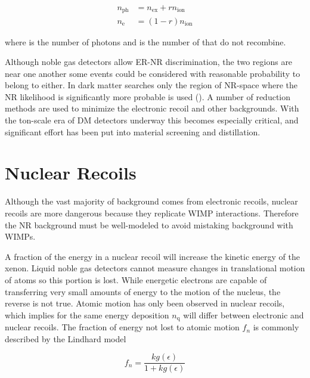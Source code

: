 \begin{subequations}
\begin{align}
n_{\mathrm{ph}} &= n_{\mathrm{ex}} + rn_{\mathrm{ion}} \\
n_{\mathrm{e}} &= (1 - r)n_{\mathrm{ion}}
\end{align}
\end{subequations}

\noindent where \nphot is the number of photons and \nelect is the number of \electron that do not recombine.

Although noble gas detectors allow ER-NR discrimination, the two regions are near one another some events could
be considered with reasonable probability to belong to either.  In dark matter searches only the region of NR-space where the NR
likelihood is significantly more probable is used ().  A number of reduction methods are used to minimize
the electronic recoil and other backgrounds.  With the ton-scale era of DM detectors
underway this becomes especially critical, and significant effort has been put into material screening and distillation.


\section{Nuclear Recoils}
\label{sec:nr}
Although the vast majority of background comes from electronic recoils, nuclear recoils are more dangerous because they replicate
WIMP interactions.  Therefore the NR background must be well-modeled to avoid mistaking background with WIMPs.

A fraction of the energy in a nuclear recoil will increase the kinetic energy of the xenon.  Liquid noble gas detectors cannot measure
changes in translational motion of atoms so this portion is lost.  While energetic electrons are capable of transferring very small
amounts of energy to the motion of the nucleus, the reverse is not true.  Atomic motion has only been observed in nuclear recoils,
which implies for the same energy deposition $n_{\mathrm{q}}$ will differ between electronic and nuclear recoils.  The fraction of energy
not lost to atomic motion $f_{n}$ is commonly described by the Lindhard model

\begin{equation}
f_{n} = \frac{k g(\epsilon)}{1 + k g(\epsilon)}
\label{eq:linhard_quenching}
\end{equation}

